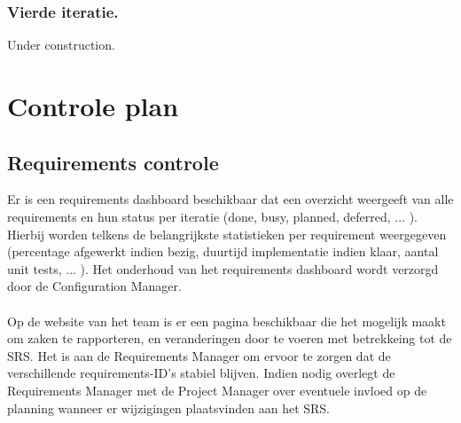 \subsubsection{Vierde iteratie.}
Under construction.


\section{Controle plan}
\subsection{Requirements controle} \label{RequirementsControlPlan}
Er is een requirements dashboard beschikbaar dat een overzicht weergeeft van alle requirements en hun status per iteratie (done, busy, planned, deferred, ... ). Hierbij worden telkens de belangrijkste statistieken per requirement weergegeven (percentage afgewerkt indien bezig, duurtijd implementatie indien klaar, aantal unit tests, ... ). Het onderhoud van het requirements dashboard wordt verzorgd door de Configuration Manager.
\\
\\
Op de website van het team \cite{portalWebsite} is er een pagina beschikbaar die het mogelijk maakt om zaken te rapporteren, en veranderingen door te voeren met betrekkeing tot de SRS. Het is aan de Requirements Manager om ervoor te zorgen dat de verschillende requirements-ID's stabiel blijven. Indien nodig overlegt de Requirements Manager met de Project Manager over eventuele invloed op de planning wanneer er wijzigingen plaatsvinden aan het SRS.

